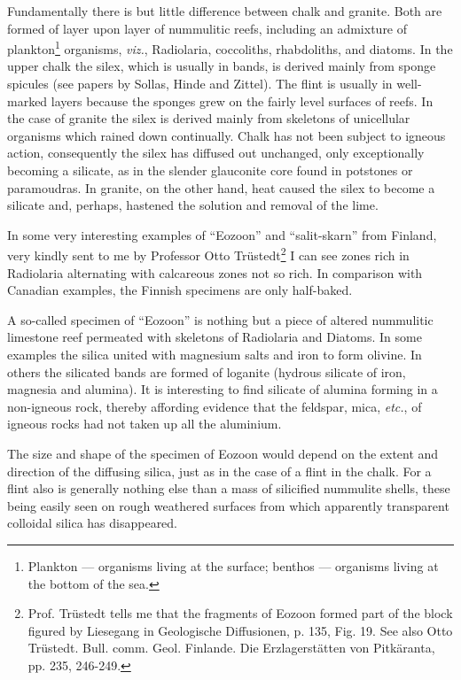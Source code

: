 \documentclass[a4paper, 12pt, oneside]{article}
\begin{document}
Fundamentally there is but little difference between chalk and granite. Both are formed of layer upon layer of nummulitic reefs, including an admixture of plankton\footnote{Plankton --- organisms living at the surface; benthos --- organisms living at the bottom of the sea.} organisms, \emph{viz.}, Radiolaria, coccoliths, rhabdoliths, and diatoms. In the upper chalk the silex, which is usually in bands, is derived mainly from sponge spicules (see papers by Sollas, Hinde and Zittel). The flint is usually in well-marked layers because the sponges grew on the fairly level surfaces of reefs. In the case of granite the silex is derived mainly from skeletons of unicellular organisms which rained down continually. Chalk has not been subject to igneous action, consequently the silex has diffused out unchanged, only exceptionally becoming a silicate, as in the slender glauconite core found in potstones or paramoudras. In granite, on the other hand, heat caused the silex to become a silicate and, perhaps, hastened the solution and removal of the lime.

In some very interesting examples of ``Eozoon'' and ``salit-skarn'' from Finland, very kindly sent to me by Professor Otto Trüstedt\footnote{Prof. Trüstedt tells me that the fragments of Eozoon formed part of the block figured by Liesegang in Geologische Diffusionen, p. 135, Fig. 19. See also Otto Trüstedt. Bull. comm. Geol. Finlande. Die Erzlagerstätten von Pitkäranta, pp. 235, 246-249.} I can see zones rich in Radiolaria alternating with calcareous zones not so rich. In comparison with Canadian examples, the Finnish specimens are only half-baked.

A so-called specimen of ``Eozoon'' is nothing but a piece of altered nummulitic limestone reef permeated with skeletons of Radiolaria and Diatoms. In some examples the silica united with magnesium salts and iron to form olivine. In others the silicated bands are formed of loganite (hydrous silicate of iron, magnesia and alumina). It is interesting to find silicate of alumina forming in a non-igneous rock, thereby affording evidence that the feldspar, mica, \emph{etc.}, of igneous rocks had not taken up all the aluminium.

The size and shape of the specimen of Eozoon would depend on the extent and direction of the diffusing silica, just as in the case of a flint in the chalk. For a flint also is generally nothing else than a mass of silicified nummulite shells, these being easily seen on rough weathered surfaces from which apparently transparent colloidal silica has disappeared.
\end{document}

